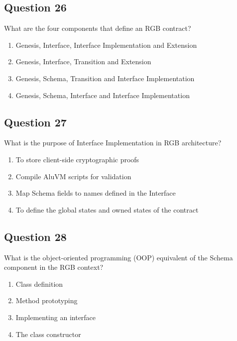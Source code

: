 \documentclass[12pt,a4paper]{article}
\begin{document}
\bigskip


\subsection*{Question 26}
What are the four components that define an RGB contract?

\begin{enumerate}[label=\Alph*., leftmargin=*]
\item Genesis, Interface, Interface Implementation and Extension
\item Genesis, Interface, Transition and Extension
\item Genesis, Schema, Transition and Interface Implementation
\item Genesis, Schema, Interface and Interface Implementation
\end{enumerate}

\bigskip


\subsection*{Question 27}
What is the purpose of Interface Implementation in RGB architecture?

\begin{enumerate}[label=\Alph*., leftmargin=*]
\item To store client-side cryptographic proofs
\item Compile AluVM scripts for validation
\item Map Schema fields to names defined in the Interface
\item To define the global states and owned states of the contract
\end{enumerate}

\bigskip


\subsection*{Question 28}
What is the object-oriented programming (OOP) equivalent of the Schema component in the RGB context?

\begin{enumerate}[label=\Alph*., leftmargin=*]
\item Class definition
\item Method prototyping
\item Implementing an interface
\item The class constructor
\end{enumerate}
\end{document}
